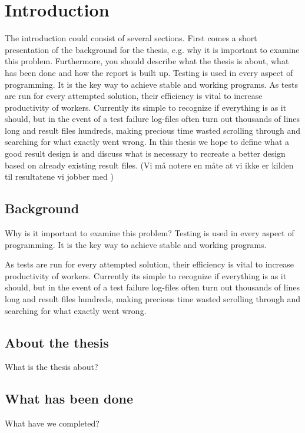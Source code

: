 \documentclass{article}
\begin{document}
\section{Introduction}
The introduction could consist of several sections. First comes a short
presentation of the background for the thesis, e.g. why it is important to examine this
problem. Furthermore, you should describe what the thesis is about, what has been done and
how the report is built up. 
\linebreak
\linebreak
Testing is used in every aspect of programming. It is the key way to achieve stable and working programs. 
As tests are run for every attempted solution, their efficiency is vital to increase productivity of workers. Currently its simple to recognize if everything is as it should, but in the event of a test failure log-files often turn out thousands of lines long and result files hundreds, making precious time wasted scrolling through and searching for what exactly went wrong.
\linebreak
In this thesis we hope to define what a good result design is and discuss what is necessary to recreate a better design based on already existing result files.
\linebreak
(Vi må notere en måte at vi ikke er kilden til resultatene vi jobber med	)
\iffalse
	\subsection{Background}
	Why is it important to examine this problem?
	\linebreak
	\linebreak
	Testing is used in every aspect of programming. It is the key way to achieve stable and working programs. 
	
	As tests are run for every attempted solution, their efficiency is vital to increase productivity of workers. Currently its simple to recognize if everything is as it should, but in the event of a test failure log-files often turn out thousands of lines long and result files hundreds, making precious time wasted scrolling through and searching for what exactly went wrong.
	
	\subsection{About the thesis}
	What is the thesis about?
	\subsection{What has been done}
	What have we completed?
\end{document}
